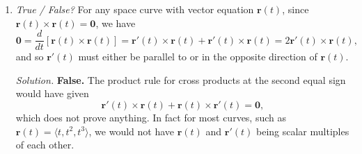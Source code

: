 \documentclass{article}
\newcommand{\rr}{\mathbf{r}}
\begin{document}
\begin{enumerate}
{\em Solution.} {\bf False.} $a$, $b$ and $c$ cannot all be negative, as the left hand side would then always be negative when the right hand side is the positive number $1$. There are only three possible types of quadric surface in this case: ellipsoid, hyperboloid of one sheet and hyperboloid of two sheets.

\item {\em True / False?} For any space curve with vector equation $\rr(t)$, since $\rr(t) \times \rr(t) = \mathbf{0}$, we have
\[
\mathbf{0} = \frac{d}{dt} [\rr(t) \times \rr(t)] = \rr'(t) \times \rr(t) + \rr'(t) \times \rr(t) = 2 \rr'(t) \times \rr(t),
\]
and so $\rr'(t)$ must either be parallel to or in the opposite direction of $\rr(t)$.

{\em Solution.} {\bf False.} The product rule for cross products at the second equal sign would have given
\[
\rr'(t) \times \rr(t) + \rr(t) \times \rr'(t) = \mathbf{0},
\]
which does not prove anything. In fact for most curves, such as $\rr(t) = \langle t, t^2, t^3 \rangle$, we would not have $\rr(t)$ and $\rr'(t)$ being scalar multiples of each other.
\end{enumerate}
\end{document}
